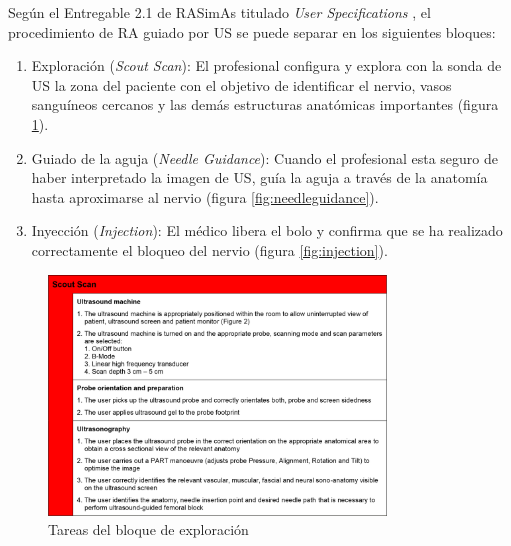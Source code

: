 Según el Entregable 2.1 de \ac{RASimAs} titulado \emph{User Specifications} \cite{ded2.1}, el procedimiento de \ac{RA} guiado por \ac{US} se puede separar en los siguientes bloques:
\begin{enumerate}
    \item Exploración (\emph{Scout Scan}): El profesional configura y explora con la sonda de \ac{US} la zona del paciente con el objetivo de identificar el nervio, vasos sanguíneos cercanos y las demás estructuras anatómicas importantes (figura \ref{fig:scoutscan}). 

    \item Guiado de la aguja (\emph{Needle Guidance}): Cuando el profesional esta seguro de haber interpretado la imagen de \ac{US}, guía la aguja a través de la anatomía hasta aproximarse al nervio (figura \ref{fig:needleguidance}).  
   
    \item Inyección (\emph{Injection}): El médico libera el bolo y confirma que se ha realizado correctamente el bloqueo del nervio (figura \ref{fig:injection}). 
   
\end{enumerate}
\begin{figure}[bh]
  \centering
    \includegraphics[width=0.8\textwidth]{IMG/scoutscan.png}
    \caption{Tareas del bloque de exploración }
  \label{fig:scoutscan}
   
\end{figure}
\clearpage

